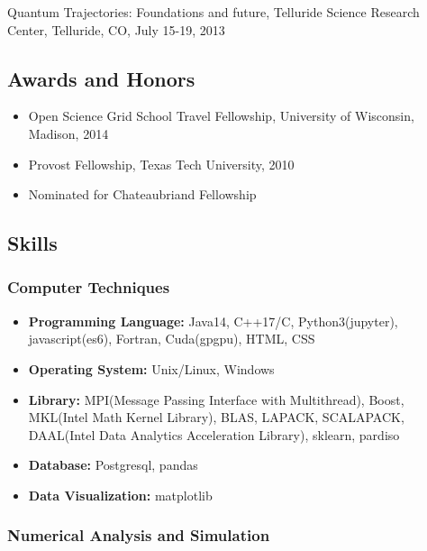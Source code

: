 \documentclass[
]{article}
\providecommand{\tightlist}{%
  \setlength{\itemsep}{0pt}\setlength{\parskip}{0pt}}
\begin{document}
Quantum Trajectories: Foundations and future, Telluride Science Research
Center, Telluride, CO, July 15-19, 2013

\hypertarget{awards-and-honors}{%
\subsection{Awards and Honors}\label{awards-and-honors}}

\begin{itemize}
\tightlist
\item
  Open Science Grid School Travel Fellowship, University of Wisconsin,
  Madison, 2014
\item
  Provost Fellowship, Texas Tech University, 2010
\item
  Nominated for Chateaubriand Fellowship
\end{itemize}

\hypertarget{skills}{%
\subsection{Skills}\label{skills}}

\hypertarget{computer-techniques}{%
\subsubsection{Computer Techniques}\label{computer-techniques}}

\begin{itemize}
\tightlist
\item
  \textbf{Programming Language:} Java14, C++17/C, Python3(jupyter),
  javascript(es6), Fortran, Cuda(gpgpu), HTML, CSS
\item
  \textbf{Operating System:} Unix/Linux, Windows
\item
  \textbf{Library:} MPI(Message Passing Interface with Multithread),
  Boost, MKL(Intel Math Kernel Library), BLAS, LAPACK, SCALAPACK,
  DAAL(Intel Data Analytics Acceleration Library), sklearn, pardiso
\item
  \textbf{Database:} Postgresql, pandas
\item
  \textbf{Data Visualization:} matplotlib
\end{itemize}

\hypertarget{numerical-analysis-and-simulation}{%
\subsubsection{Numerical Analysis and
Simulation}\label{numerical-analysis-and-simulation}}
\end{document}

